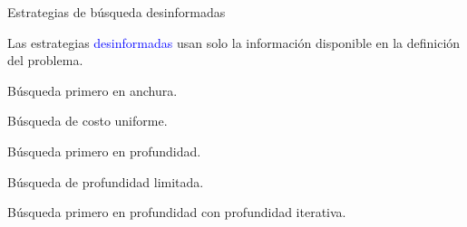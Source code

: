 \begin{frame}{Estrategias de búsqueda desinformadas}

  
    Las estrategias \textcolor{blue}{desinformadas} usan solo la información disponible en la definición del problema.
    \bigskip
    \bigskip
    
    Búsqueda primero en anchura.
    \bigskip
    
    Búsqueda de costo uniforme.
    \bigskip
    
    Búsqueda primero en profundidad.
    \bigskip
    
    Búsqueda de profundidad limitada.
    \bigskip
    
    Búsqueda primero en profundidad con profundidad iterativa.

    
\end{frame}